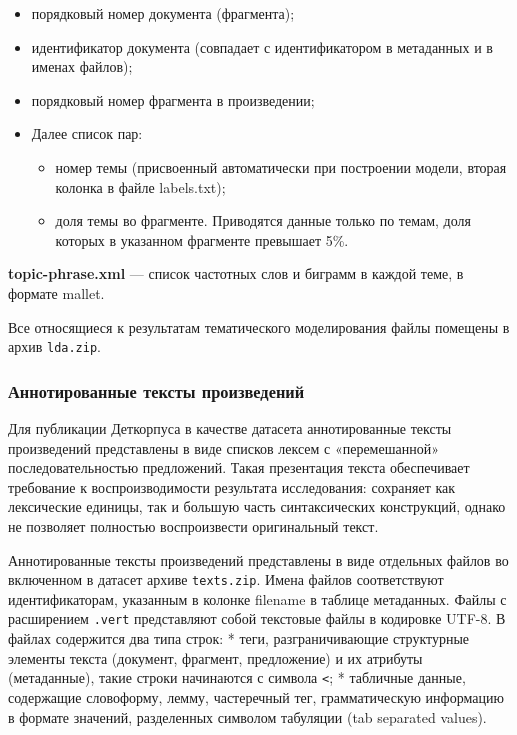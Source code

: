\documentclass[
]{article}
\providecommand{\tightlist}{%
  \setlength{\itemsep}{0pt}\setlength{\parskip}{0pt}}
\begin{document}
\begin{itemize}
\tightlist
\item
  порядковый номер документа (фрагмента);
\item
  идентификатор документа (совпадает с идентификатором в метаданных и в
  именах файлов);
\item
  порядковый номер фрагмента в произведении;
\item
  Далее список пар:

  \begin{itemize}
  \tightlist
  \item
    номер темы (присвоенный автоматически при построении модели, вторая
    колонка в файле labels.txt);
  \item
    доля темы во фрагменте. Приводятся данные только по темам, доля
    которых в указанном фрагменте превышает 5\%.
  \end{itemize}
\end{itemize}

\textbf{topic-phrase.xml} --- список частотных слов и биграмм в каждой
теме, в формате mallet.

Все относящиеся к результатам тематического моделирования файлы помещены
в архив \texttt{lda.zip}.

\hypertarget{ux430ux43dux43dux43eux442ux438ux440ux43eux432ux430ux43dux43dux44bux435-ux442ux435ux43aux441ux442ux44b-ux43fux440ux43eux438ux437ux432ux435ux434ux435ux43dux438ux439}{%
\subsubsection{Аннотированные тексты
произведений}\label{ux430ux43dux43dux43eux442ux438ux440ux43eux432ux430ux43dux43dux44bux435-ux442ux435ux43aux441ux442ux44b-ux43fux440ux43eux438ux437ux432ux435ux434ux435ux43dux438ux439}}

Для публикации Деткорпуса в качестве датасета аннотированные тексты
произведений представлены в виде списков лексем с «перемешанной»
последовательностью предложений. Такая презентация текста обеспечивает
требование к воспроизводимости результата исследования: сохраняет как
лексические единицы, так и большую часть синтаксических конструкций,
однако не позволяет полностью воспроизвести оригинальный текст.

Аннотированные тексты произведений представлены в виде отдельных файлов
во включенном в датасет архиве \texttt{texts.zip}. Имена файлов
соответствуют идентификаторам, указанным в колонке filename в таблице
метаданных. Файлы с расширением \texttt{.vert} представляют собой
текстовые файлы в кодировке UTF-8. В файлах содержится два типа строк: *
теги, разграничивающие структурные элементы текста (документ, фрагмент,
предложение) и их атрибуты (метаданные), такие строки начинаются с
символа \texttt{\textless{}}; * табличные данные, содержащие словоформу,
лемму, частеречный тег, грамматическую информацию в формате значений,
разделенных символом табуляции (tab separated values).
\end{document}
